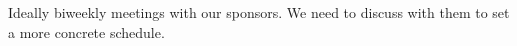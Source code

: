 Ideally biweekly meetings with our sponsors.  We need to discuss with them to set a more concrete schedule.